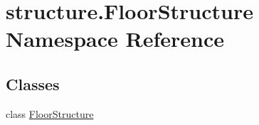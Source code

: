\hypertarget{namespacestructure_1_1_floor_structure}{\section{structure.\-Floor\-Structure Namespace Reference}
\label{namespacestructure_1_1_floor_structure}
}
\subsection*{Classes}
\begin{DoxyCompactItemize}
\item 
class \hyperlink{classstructure_1_1_floor_structure_1_1_floor_structure}{Floor\-Structure}
\end{DoxyCompactItemize}

